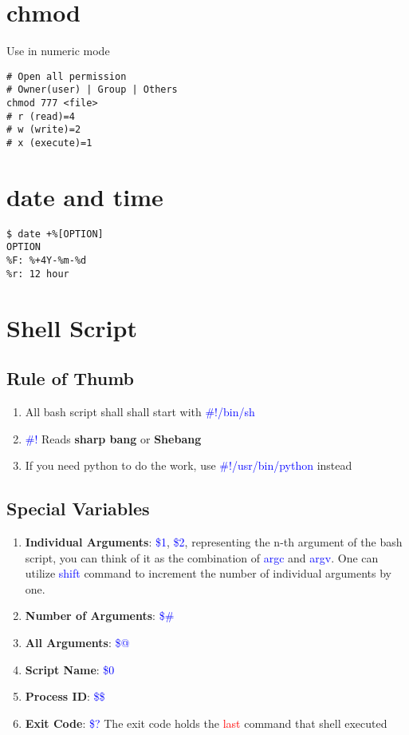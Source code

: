 \documentclass[12pt,a4paper]{article}
\newcommand{\rt}[1]{\textcolor{red}{#1}}
\newcommand{\bt}[1]{\textcolor{blue}{#1}}
\begin{document}
\section{chmod}
Use in numeric mode
\begin{footnotesize}
\begin{verbatim}
# Open all permission
# Owner(user) | Group | Others
chmod 777 <file>
# r (read)=4
# w (write)=2
# x (execute)=1
\end{verbatim}
\end{footnotesize}

\section{date and time}
\begin{footnotesize}
\begin{verbatim}
$ date +%[OPTION]
OPTION
%F: %+4Y-%m-%d
%r: 12 hour
\end{verbatim}
\end{footnotesize}

\section{Shell Script}
\subsection{Rule of Thumb}
\begin{enumerate}
	\item All bash script shall shall start with \bt{\#!/bin/sh}
	\item \bt{\#!} Reads \textbf{sharp bang} or \textbf{Shebang}
	\item If you need python to do the work, use \bt{\#!/usr/bin/python} instead
\end{enumerate}

\subsection{Special Variables}
\begin{enumerate}
	\item \textbf{Individual Arguments}: \bt{\$1}, \bt{\$2}, representing the n-th argument of the bash script, you can think of it as the combination of \bt{argc} and \bt{argv}. One can utilize \bt{shift} command to increment the number of individual arguments by one.
	\item \textbf{Number of Arguments}: \bt{\$\#}
	\item \textbf{All Arguments}: \bt{\$@}
	\item \textbf{Script Name}: \bt{\$0}
	\item \textbf{Process ID}: \bt{\$\$}
	\item \textbf{Exit Code}: \bt{\$?} The exit code holds the \rt{last} command that shell executed
\end{enumerate}
\end{document}
